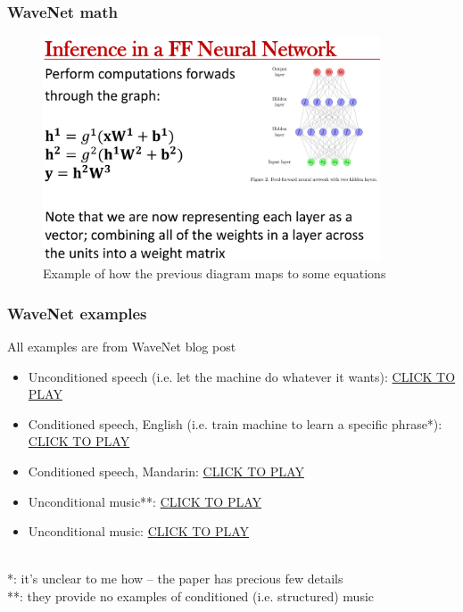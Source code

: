 \documentclass{beamer}
\begin{document}
\begin{frame}
	\frametitle{WaveNet math}
	\begin{figure}
	\includegraphics[width=10cm]{./nn_inference.png}
		\caption{Example of how the previous diagram maps to some equations }
	\end{figure}
\end{frame}

\begin{frame}
	\frametitle{WaveNet examples}
	All examples are from WaveNet blog post
	\begin{itemize}
		\item
			Unconditioned speech (i.e. let the machine do whatever it wants): \href{run:./wavenet_speech_unconditional.wav}{CLICK TO PLAY}
		\item
			Conditioned speech, English (i.e. train machine to learn a specific phrase*): \href{run:./wavenet_speech_conditioned_english.wav}{CLICK TO PLAY}
		\item
			Conditioned speech, Mandarin: \href{run:./wavenet_speech_conditioned_mandarin.wav}{CLICK TO PLAY}
		\item
			Unconditional music**: \href{run:./wavenet_sample_1.wav}{CLICK TO PLAY}
		\item
			Unconditional music: \href{run:./wavenet_sample_2.wav}{CLICK TO PLAY}
	\end{itemize}\ \\
	\vspace{1em}
	*: it's unclear to me how -- the paper has precious few details\\
	**: they provide no examples of conditioned (i.e. structured) music
\end{frame}
\end{document}
